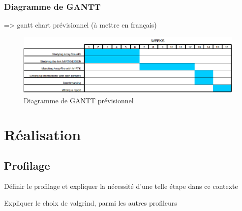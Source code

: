 \documentclass[12pt]{report}
\begin{document}
	
	\subsection{Diagramme de GANTT}
	 => gantt chart prévisionnel (à mettre en français)
	\begin{figure}[h!]
		\begin{center}
			\includegraphics[width=18cm]{Reports/figures/estimated_gantt.png}
		\end{center}	
		\caption{Diagramme de GANTT prévisionnel}
		\label{Diagramme de GANTT prévisionnel}
	\end{figure}
\chapter{Réalisation}
	\section{Profilage}
	Définir le profilage et expliquer la nécessité d'une telle étape dans ce contexte\newline
	
	Expliquer le choix de valgrind, parmi les autres profileurs
%	
	
\end{document}
